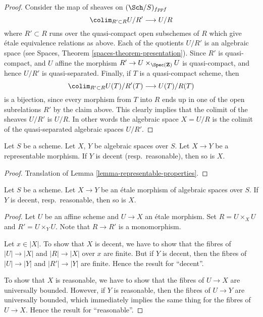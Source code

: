 \begin{proof}
\medskip\noindent
Consider the map of sheaves on $(\Sch/S)_{fppf}$
$$
\colim_{R' \subset R} U/R' \longrightarrow U/R
$$
where $R' \subset R$ runs over the quasi-compact open subschemes
of $R$ which give \'etale equivalence relations as above. Each of the
quotients $U/R'$ is an algebraic space
(see Spaces, Theorem \ref{spaces-theorem-presentation}).
Since $R'$ is quasi-compact, and $U$ affine the morphism
$R' \to U \times_{\Spec(\mathbf{Z})} U$ is quasi-compact,
and hence $U/R'$ is quasi-separated. Finally, if $T$ is a quasi-compact
scheme, then
$$
\colim_{R' \subset R} U(T)/R'(T) \longrightarrow U(T)/R(T)
$$
is a bijection, since every morphism from $T$ into $R$ ends up in one
of the open subrelations $R'$ by the claim above. This clearly implies
that the colimit of the sheaves $U/R'$ is $U/R$. In other words
the algebraic space $X = U/R$ is the colimit of the quasi-separated
algebraic spaces $U/R'$.
\end{proof}

\begin{lemma}
\label{lemma-representable-named-properties}
Let $S$ be a scheme. Let $X$, $Y$ be algebraic spaces over $S$.
Let $X \to Y$ be a representable morphism.
If $Y$ is decent (resp.\ reasonable), then so is $X$.
\end{lemma}

\begin{proof}
Translation of Lemma \ref{lemma-representable-properties}.
\end{proof}

\begin{lemma}
\label{lemma-etale-named-properties}
Let $S$ be a scheme. Let $X \to Y$ be an \'etale morphism of
algebraic spaces over $S$. If $Y$ is decent, resp.\ reasonable,
then so is $X$.
\end{lemma}

\begin{proof}
Let $U$ be an affine scheme and $U \to X$ an \'etale morphism.
Set $R = U \times_X U$ and $R' = U \times_Y U$. Note that
$R \to R'$ is a monomorphism.

\medskip\noindent
Let $x \in |X|$. To show that $X$ is decent, we have to show that
the fibres of $|U| \to |X|$ and $|R| \to |X|$ over $x$ are finite.
But if $Y$ is decent, then the fibres of $|U| \to |Y|$ and
$|R'| \to |Y|$ are finite. Hence the result for ``decent''.

\medskip\noindent
To show that $X$ is reasonable, we have to show that the fibres of
$U \to X$ are universally bounded. However, if $Y$ is reasonable,
then the fibres of $U \to Y$ are universally bounded, which immediately
implies the same thing for the fibres of $U \to X$.
Hence the result for ``reasonable''.
\end{proof}







